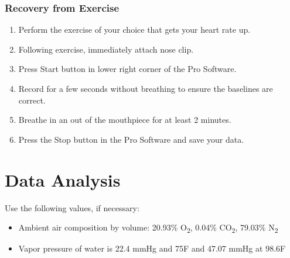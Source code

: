 \documentclass{article}
\begin{document}
\subsubsection*{Recovery from Exercise}
\begin{enumerate}
	\item Perform the exercise of your choice that gets your heart rate up.
	\item Following exercise, immediately attach nose clip.
	\item Press Start button in lower right corner of the Pro Software.
	\item Record for a few seconds without breathing to ensure the baselines are correct.
	\item Breathe in an out of the mouthpiece for at least 2 minutes.
	\item Press the Stop button in the Pro Software and save your data.
\end{enumerate}

\section*{Data Analysis}

Use the following values, if necessary:\begin{itemize}
	\item Ambient air composition by volume: 20.93\% O\textsubscript{2}, 0.04\% CO\textsubscript{2}, 79.03\% N\textsubscript{2}
	\item Vapor pressure of water is 22.4 mmHg and 75\degree F and 47.07 mmHg at 98.6\degree F
\end{itemize}
\end{document}
